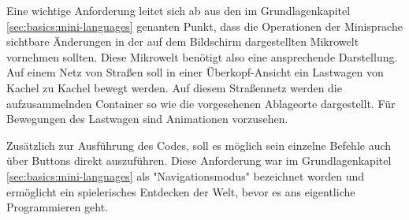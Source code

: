 Eine wichtige Anforderung leitet sich ab aus den im Grundlagenkapitel \ref{sec:basics:mini-languages} genanten Punkt, dass die Operationen der Minisprache sichtbare Änderungen in der auf dem Bildschirm dargestellten Mikrowelt vornehmen sollten. Diese Mikrowelt benötigt also eine ansprechende Darstellung. Auf einem Netz von Straßen soll in einer Überkopf-Ansicht ein Lastwagen von Kachel zu Kachel bewegt werden. Auf diesem Straßennetz werden die aufzusammelnden Container so wie die vorgesehenen Ablageorte dargestellt. Für Bewegungen des Lastwagen sind Animationen vorzusehen.

Zusätzlich zur Ausführung des Codes, soll es möglich sein einzelne Befehle auch über Buttons direkt auszuführen. Diese Anforderung war im Grundlagenkapitel \ref{sec:basics:mini-languages} als "Navigationsmodus" bezeichnet worden und ermöglicht ein spielerisches Entdecken der Welt, bevor es ans eigentliche Programmieren geht.
